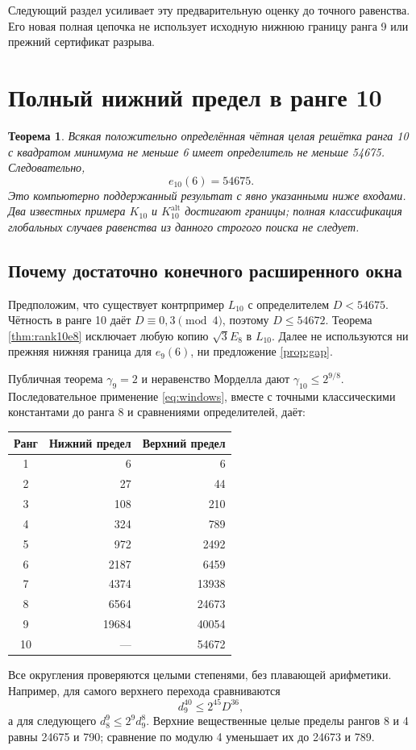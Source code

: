 \documentclass[11pt,a4paper]{article}
\newtheorem{theorem}{Теорема}[section]
\theoremstyle{remark}\newtheorem{remark}[theorem]{Замечание}
\newcommand{\Kalt}{K_{10}^{\mathrm{alt}}}
\begin{document}
Следующий раздел усиливает эту предварительную оценку до точного равенства. Его новая полная цепочка не использует исходную нижнюю границу ранга 9 или прежний сертификат разрыва.

\section{Полный нижний предел в ранге 10}\label{sec:global10exact}

\begin{theorem}\label{thm:e10exact}
Всякая положительно определённая чётная целая решётка ранга 10 с квадратом минимума не меньше 6 имеет определитель не меньше 54675. Следовательно,
\[
\boxed{e_{10}(6)=54675}.
\]
Это компьютерно поддержанный результат с явно указанными ниже входами. Два известных примера $K_{10}$ и $\Kalt$ достигают границы; полная классификация \emph{глобальных} случаев равенства из данного строгого поиска не следует.
\end{theorem}

\subsection{Почему достаточно конечного расширенного окна}

Предположим, что существует контрпример $L_{10}$ с определителем $D<54675$. Чётность в ранге 10 даёт $D\equiv0,3\pmod4$, поэтому $D\le54672$. Теорема \ref{thm:rank10e8} исключает любую копию $\sqrt3E_8$ в $L_{10}$. Далее не используются ни прежняя нижняя граница для $e_9(6)$, ни предложение \ref{prop:gap}.

Публичная теорема $\gamma_9=2$ и неравенство Морделла дают $\gamma_{10}\le2^{9/8}$. Последовательное применение \eqref{eq:windows}, вместе с точными классическими константами до ранга 8 и сравнениями определителей, даёт:
\begin{center}
\begin{tabular}{crr}
\toprule
Ранг & Нижний предел & Верхний предел\\\midrule
1&6&6\\
2&27&44\\
3&108&210\\
4&324&789\\
5&972&2492\\
6&2187&6459\\
7&4374&13938\\
8&6564&24673\\
9&19684&40054\\
10&---&54672\\
\bottomrule
\end{tabular}
\end{center}
Все округления проверяются целыми степенями, без плавающей арифметики. Например, для самого верхнего перехода сравниваются
\[
d_9^{40}\le2^{45}D^{36},
\]
а для следующего $d_8^9\le2^9d_9^8$. Верхние вещественные целые пределы рангов 8 и 4 равны 24675 и 790; сравнение по модулю 4 уменьшает их до 24673 и 789.
\end{document}
